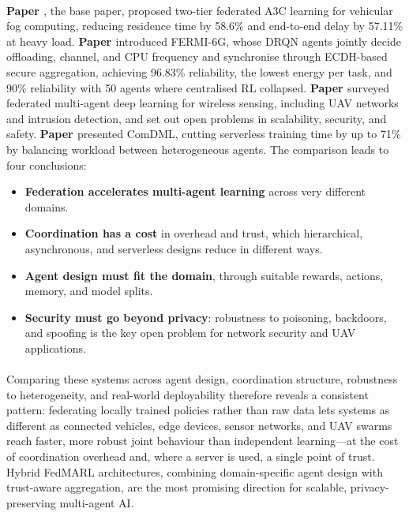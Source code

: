 \documentclass[12pt,a4paper,final]{extreport}
\begin{document}
\paragraph{} \textbf{Paper \cite{p1}}, the base paper, proposed two-tier federated A3C learning for vehicular fog computing, reducing residence time by 58.6\% and end-to-end delay by 57.11\% at heavy load. \textbf{Paper \cite{p2}} introduced FERMI-6G, whose DRQN agents jointly decide offloading, channel, and CPU frequency and synchronise through ECDH-based secure aggregation, achieving 96.83\% reliability, the lowest energy per task, and 90\% reliability with 50 agents where centralised RL collapsed. \textbf{Paper \cite{p3}} surveyed federated multi-agent deep learning for wireless sensing, including UAV networks and intrusion detection, and set out open problems in scalability, security, and safety. \textbf{Paper \cite{p4}} presented ComDML, cutting serverless training time by up to 71\% by balancing workload between heterogeneous agents. The comparison leads to four conclusions:
\begin{itemize}
  \item \textbf{Federation accelerates multi-agent learning} across very different domains.
  \item \textbf{Coordination has a cost} in overhead and trust, which hierarchical, asynchronous, and serverless designs reduce in different ways.
  \item \textbf{Agent design must fit the domain}, through suitable rewards, actions, memory, and model splits.
  \item \textbf{Security must go beyond privacy}: robustness to poisoning, backdoors, and spoofing is the key open problem for network security and UAV applications.
\end{itemize}

\paragraph{} Comparing these systems across agent design, coordination structure, robustness to heterogeneity, and real-world deployability therefore reveals a consistent pattern: federating locally trained policies rather than raw data lets systems as different as connected vehicles, edge devices, sensor networks, and UAV swarms reach faster, more robust joint behaviour than independent learning---at the cost of coordination overhead and, where a server is used, a single point of trust. Hybrid FedMARL architectures, combining domain-specific agent design with trust-aware aggregation, are the most promising direction for scalable, privacy-preserving multi-agent AI.
\end{document}
